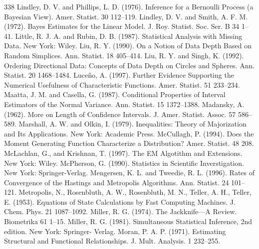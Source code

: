 \begin{thebibliography}{338}
\label{bib:source206} Lindley, D. V. and Phillips, L. D. (1976). Inference for a Bernoulli Process (a Bayesian View). Amer. Statist. 30 112–119.
\label{bib:source207} Lindley, D. V. and Smith, A. F. M. (1972). Bayes Estimates for the Linear Model. J. Roy. Statist. Soc. Ser. B 34 1–41.
\label{bib:source208} Little, R. J. A. and Rubin, D. B. (1987). Statistical Analysis with Missing Data. New York: Wiley.
\label{bib:source209} Liu, R. Y. (1990). On a Notion of Data Depth Based on Random Simplices. Ann. Statist. 18 405–414.
\label{bib:source210} Liu, R. Y. and Singh, K. (1992). Ordering Directional Data: Concepts of Data Depth on Circles and Spheres. Ann. Statist. 20 1468–1484.
\label{bib:source211} Luceño, A. (1997). Further Evidence Supporting the Numerical Usefulness of Characteristic Functions. Amer. Statist. 51 233–234.
\label{bib:source212} Maatta, J. M. and Casella, G. (1987). Conditional Properties of Interval Estimators of the Normal Variance. Ann. Statist. 15 1372–1388.
\label{bib:source213} Madansky, A. (1962). More on Length of Confidence Intervals. J. Amer. Statist. Assoc. 57 586–589.
\label{bib:source214} Marshall, A. W. and Olkin, I. (1979). Inequalities: Theory of Majorization and Its Applications. New York: Academic Press.
\label{bib:source215} McCullagh, P. (1994). Does the Moment Generating Function Characterize a Distribution? Amer. Statist. 48 208.
\label{bib:source216} McLachlan, G., and Krishnan, T. (1997). The EM Algotithm and Extensions. New York: Wiley.
\label{bib:source217} McPherson, G. (1990). Statistics in Scientific Inverstigation. New York: Springer-Verlag.
\label{bib:source218} Mengersen, K. L. and Tweedie, R. L. (1996). Rates of Convergence of the Hastings and Metropolis Algorithms. Ann. Statist. 24 101–121.
\label{bib:source219} Metropolis, N., Rosenbluth, A. W., Rosenbluth, M. N., Teller, A. H., Teller, E. (1953). Equations of State Calculations by Fast Computing Machines. J. Chem. Phys. 21 1087–1092.
\label{bib:source220} Miller, R. G. (1974). The Jackknife—A Review. Biometrika 61 1–15.
\label{bib:source221} Miller, R. G. (1981). Simultaneous Statistical Inference, 2nd edition. New York: Springer- Verlag.
\label{bib:source222} Moran, P. A. P. (1971). Estimating Structural and Functional Relationships. J. Mult. Analysis. 1 232–255.

\end{thebibliography}
